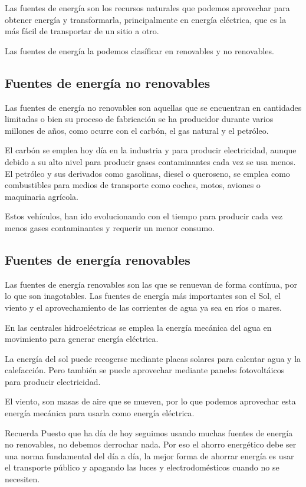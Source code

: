 Las fuentes de energía son los recursos naturales que podemos aprovechar para obtener energía y transformarla, principalmente en energía eléctrica, que es la más fácil de transportar de un sitio a otro.

Las fuentes de energía la podemos clasíficar en renovables y no renovables.

\subsection*{Fuentes de energía no renovables}

Las fuentes de energía no renovables son aquellas que se encuentran en cantidades limitadas o bien su proceso de fabricación se ha producidor durante varios millones de años, como ocurre con el carbón, el gas natural y el petróleo.

El carbón se emplea hoy día en la industria y para producir electricidad, aunque debido a su alto nivel para producir gases contaminantes cada vez se usa menos. El petróleo y sus derivados como gasolinas, diesel o queroseno, se emplea como combustibles para medios de transporte como coches, motos, aviones o maquinaria agrícola. 

Estos vehículos, han ido evolucionando con el tiempo para producir cada vez menos gases contaminantes y requerir un menor consumo.

\subsection*{Fuentes de energía renovables}

Las fuentes de energía renovables son las que se renuevan de forma contínua, por lo que son inagotables. Las fuentes de energía más importantes son el Sol, el viento y el aprovechamiento de las corrientes de agua ya sea en ríos o mares.

En las centrales hidroeléctricas se emplea la energía mecánica del agua en movimiento para generar energía eléctrica. 

La energía del sol puede recogerse mediante placas solares para calentar agua y la calefacción. Pero también se puede aprovechar mediante paneles fotovoltáicos para producir electricidad.

El viento, son masas de aire que se mueven, por lo que podemos aprovechar esta energía mecánica para usarla como energía eléctrica.



\begin{recuerda}{Recuerda}
Puesto que ha día de hoy seguimos usando muchas fuentes de energía no renovables, no debemos derrochar nada. Por eso el ahorro energético debe ser una norma fundamental del día a día, la mejor forma de ahorrar energía es usar el transporte público y apagando las luces y electrodomésticos cuando no se necesiten.
\end{recuerda}
